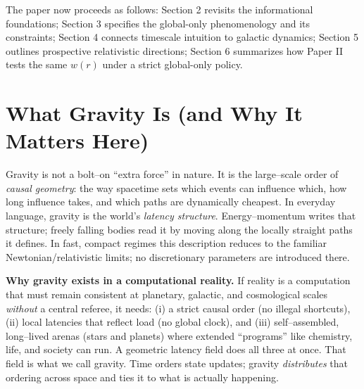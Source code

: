 \documentclass[usenatbib]{mnras}
\begin{document}
The paper now proceeds as follows: Section 2 revisits the informational foundations; Section 3 specifies the global-only phenomenology and its constraints; Section 4 connects timescale intuition to galactic dynamics; Section 5 outlines prospective relativistic directions; Section 6 summarizes how Paper II tests the same $w(r)$ under a strict global-only policy.

\section{What Gravity Is (and Why It Matters Here)}
\label{sec:what-gravity-is}

Gravity is not a bolt–on “extra force” in nature. It is the large–scale order of \emph{causal geometry}: the way spacetime sets which events can influence which, how long influence takes, and which paths are dynamically cheapest. In everyday language, gravity is the world’s \emph{latency structure}. Energy–momentum writes that structure; freely falling bodies read it by moving along the locally straight paths it defines. In fast, compact regimes this description reduces to the familiar Newtonian/relativistic limits; no discretionary parameters are introduced there.

\vspace{0.5em}
\noindent\textbf{Why gravity exists in a computational reality.}
If reality is a computation that must remain consistent at planetary, galactic, and cosmological scales \emph{without} a central referee, it needs:
(i) a strict causal order (no illegal shortcuts),
(ii) local latencies that reflect load (no global clock),
and (iii) self–assembled, long–lived arenas (stars and planets) where extended “programs” like chemistry, life, and society can run.
A geometric latency field does all three at once. That field is what we call gravity.
Time orders state updates; gravity \emph{distributes} that ordering across space and ties it to what is actually happening.
\end{document}
